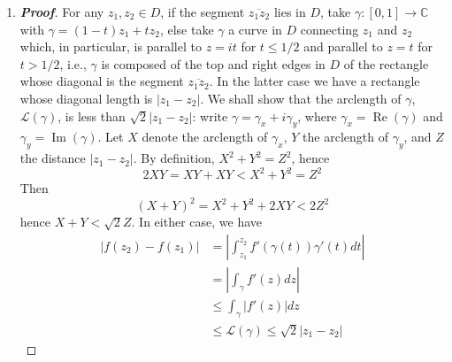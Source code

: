 \documentclass[12pt,leqno]{article}
\theoremstyle{definition}
\newcommand{\re}{\operatorname{Re}}
\newcommand{\im}{\operatorname{Im}}
\newcommand{\C}{\mathbb{C}}
\newenvironment{Proof}{\begin{proof}[\textnormal{\textbf{Proof}}]}{\end{proof}}
\newenvironment{Solution}{\begin{proof}[\textnormal{\textbf{Solution}}]}{\end{proof}}
\begin{document}
\begin{enumerate}
\begin{Solution}
\begin{itemize}
      \item Let $u=\gamma(t)$. Then $du=\gamma'(t)dt$, hence \begin{align*}I_3=\int_{\gamma}\frac{dz}{z^3}=\int_{-1}^1\frac{\gamma'(t)}{\gamma(t)^3}dt&=\int_{-i}^i\frac{1}{u^3}du\\&=-\frac{1}{2}\frac{1}{u^2}\Big|_{-i}^i\\&=0\end{align*}\qedhere
     \end{itemize}
    \end{Solution}
   \item 
    \begin{Proof}
     For any $z_1,z_2\in D$, if the segment $\overline{z_1z_2}$ lies in $D$, take $\gamma:[0,1]\to\C$ with $\gamma=(1-t)z_1+tz_2$, else take $\gamma$ a curve in $D$ connecting $z_1$ and $z_2$ which, in particular, is parallel to $z=it$ for $t\leq1/2$ and parallel to $z=t$ for $t>1/2$, i.e., $\gamma$ is composed of the top and right edges in $D$ of the rectangle whose diagonal is the segment $\overline{z_1z_2}$. In the latter case we have a rectangle whose diagonal length is $|z_1-z_2|$. We shall show that the arclength of $\gamma$, $\mathcal{L}(\gamma)$, is less than $\sqrt{2}|z_1-z_2|$: write $\gamma=\gamma_x+i\gamma_y$, where $\gamma_x=\re(\gamma)$ and $\gamma_y=\im(\gamma)$. Let $X$ denote the arclength of $\gamma_x$, $Y$ the arclength of $\gamma_y$, and $Z$ the distance $|z_1-z_2|$. By definition, $X^2+Y^2=Z^2$, hence \[2XY=XY+XY<X^2+Y^2=Z^2\] Then \[(X+Y)^2=X^2+Y^2+2XY<2Z^2\] hence $X+Y<\sqrt{2}Z$. In either case, we have \begin{align*}\left|f(z_2)-f(z_1)\right|&=\left|\int_{z_1}^{z_2}f'(\gamma(t))\gamma'(t)dt\right|\\&=\left|\int_{\gamma}f'(z)dz\right|\\&\leq\int_{\gamma}|f'(z)|dz\\&\leq\mathcal{L}(\gamma)\leq\sqrt{2}|z_1-z_2|\end{align*}
    \end{Proof}
\end{enumerate}
\end{document}
